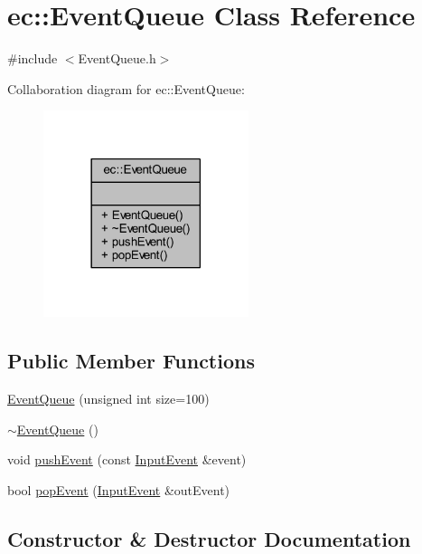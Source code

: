\hypertarget{classec_1_1_event_queue}{}\section{ec\+:\+:Event\+Queue Class Reference}
\label{classec_1_1_event_queue}


{\ttfamily \#include $<$Event\+Queue.\+h$>$}



Collaboration diagram for ec\+:\+:Event\+Queue\+:\nopagebreak
\begin{figure}[H]
\begin{center}
\leavevmode
\includegraphics[width=170pt]{classec_1_1_event_queue__coll__graph}
\end{center}
\end{figure}
\subsection*{Public Member Functions}
\begin{DoxyCompactItemize}
\item 
\mbox{\hyperlink{classec_1_1_event_queue_aee3a6823b58d2fbf23a5148d28dc6d2d}{Event\+Queue}} (unsigned int size=100)
\item 
\mbox{\hyperlink{classec_1_1_event_queue_a98fb5b9cf781f87dee6443831dc42e65}{$\sim$\+Event\+Queue}} ()
\item 
void \mbox{\hyperlink{classec_1_1_event_queue_aa69f9fd21873ad138b78de33fb867efb}{push\+Event}} (const \mbox{\hyperlink{structec_1_1_input_event}{Input\+Event}} \&event)
\item 
bool \mbox{\hyperlink{classec_1_1_event_queue_a58cdf15f7320b9eb70fd5937a68f3656}{pop\+Event}} (\mbox{\hyperlink{structec_1_1_input_event}{Input\+Event}} \&out\+Event)
\end{DoxyCompactItemize}


\subsection{Constructor \& Destructor Documentation}
\mbox{\label{classec_1_1_event_queue_aee3a6823b58d2fbf23a5148d28dc6d2d}} 

